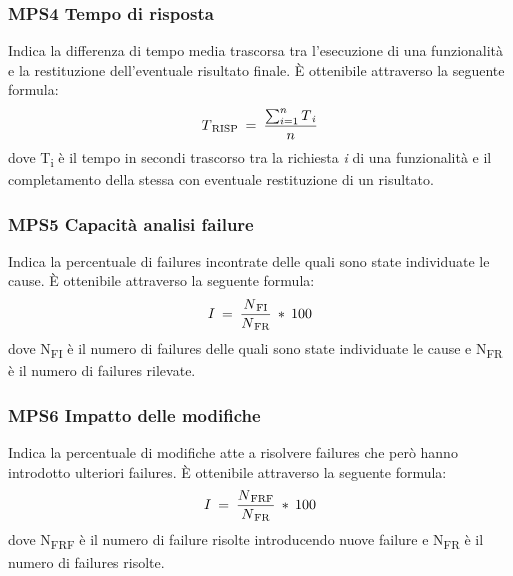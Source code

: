       \subsubsection{MPS4 Tempo di risposta}
      Indica la differenza di tempo media trascorsa tra l'esecuzione di una funzionalità e la restituzione dell'eventuale risultato finale. È ottenibile attraverso la seguente formula:
        \begin{displaymath}{T\textsubscript{RISP} \: = \: {\sum_{i=1}^n{T\textsubscript{\textit{i}}} \over n}}\end{displaymath}
          dove T\textsubscript{i} è il tempo in secondi trascorso tra la richiesta \textit{i} di una funzionalità e il completamento della stessa con eventuale restituzione di un risultato.
      
      \subsubsection{MPS5 Capacità analisi failure}
      Indica la percentuale di failures incontrate delle quali sono state individuate le cause. È ottenibile attraverso la seguente formula:
        \begin{displaymath}{I \: = \: {N\textsubscript{FI} \over N\textsubscript{FR}} \: * \: 100}\end{displaymath}
          dove N\textsubscript{FI} è il numero di failures delle quali sono state individuate le cause e N\textsubscript{FR} è il numero di failures rilevate.
  
      \subsubsection{MPS6 Impatto delle modifiche}
      Indica la percentuale di modifiche atte a risolvere failures che però hanno introdotto ulteriori failures. È ottenibile attraverso la seguente formula:
        \begin{displaymath}{I \: = \: {N\textsubscript{FRF} \over N\textsubscript{FR}} \: * \: 100}\end{displaymath}
          dove N\textsubscript{FRF} è il numero di failure risolte introducendo nuove failure e N\textsubscript{FR} è il numero di failures risolte.
  


